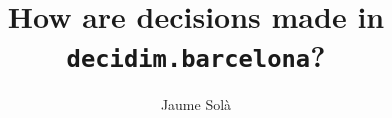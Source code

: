 \documentclass[a4paper,12pt,twoside]{report}
\begin{document}

\title{How are decisions made in \texttt{decidim.barcelona}?}
\author{Jaume Sol\`a}
%

\maketitle
\restoregeometry

\preface
\cleardoublepage 
%
%


\body






\listoffigures
\newpage
\listoftables

%


\end{document}
